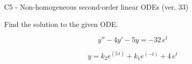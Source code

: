 \begin{exercise}
  \begin{exerciseTitle}C5 - Non-homogeneous second-order linear ODEs (ver. 33)\end{exerciseTitle}
  \begin{exerciseStatement}
    
Find the solution to the given ODE.

    
\[y''-4y'-5y = -32 \, e^{t}\]

  \end{exerciseStatement}
  \begin{exerciseAnswer}
    
\[y= k_{2} e^{\left(5 \, t\right)} + k_{1} e^{\left(-t\right)} + 4 \, e^{t}\]

  \end{exerciseAnswer}
\end{exercise}